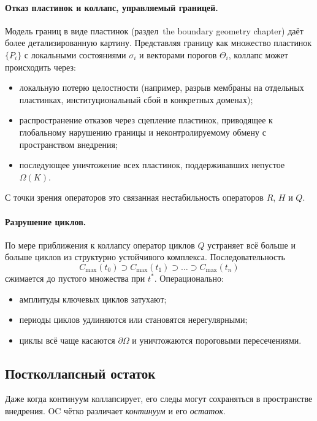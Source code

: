 \paragraph{Отказ пластинок и коллапс, управляемый границей.}
Модель границ в виде пластинок
(раздел~the boundary geometry chapter) даёт более детализированную картину.
Представляя границу как множество пластинок \(\{P_i\}\) с локальными
состояниями \(\sigma_i\) и векторами порогов \(\Theta_i\), коллапс может
происходить через:
\begin{itemize}
  \item локальную потерю целостности (например, разрыв мембраны на отдельных
        пластинках, институциональный сбой в конкретных доменах);
  \item распространение отказов через сцепление пластинок, приводящее к
        глобальному нарушению границы и неконтролируемому обмену с пространством
        внедрения;
  \item последующее уничтожение всех пластинок, поддерживавших непустое
        \(\Omega(K)\).
\end{itemize}
С точки зрения операторов это связанная нестабильность операторов \(R\),
\(H\) и \(Q\).

\paragraph{Разрушение циклов.}
По мере приближения к коллапсу оператор циклов \(Q\) устраняет всё больше и
больше циклов из структурно устойчивого комплекса. Последовательность
\[
  C_{\max}(t_0)
  \supset C_{\max}(t_1)
  \supset \dots
  \supset C_{\max}(t_n)
\]
сжимается до пустого множества при \(t^{\ast}\). Операционально:
\begin{itemize}
  \item амплитуды ключевых циклов затухают;
  \item периоды циклов удлиняются или становятся нерегулярными;
  \item циклы всё чаще касаются \(\partial\Omega\) и уничтожаются пороговыми
        пересечениями.
\end{itemize}

\subsection{Постколлапсный остаток}

Даже когда континуум коллапсирует, его следы могут сохраняться в пространстве
внедрения. OC чётко различает \emph{континуум} и его \emph{остаток}.

